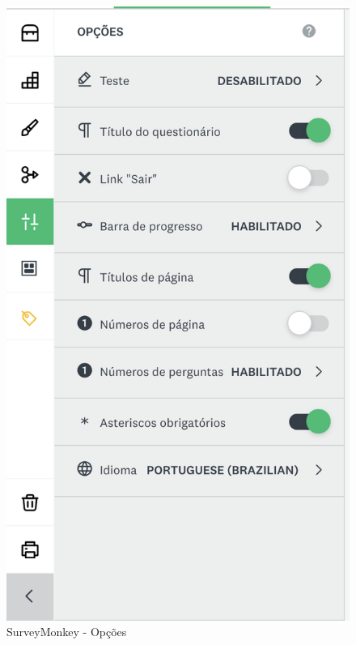 \begin{figure}[ht!]
	\begin{center}
		\includegraphics[height=.35\textheight]{img/sm/surveymonkey-form-opcoes}
		\caption{SurveyMonkey - Opções}
		\label{fig:surveymonkey-form-opcoes}
	\end{center}
\end{figure}

